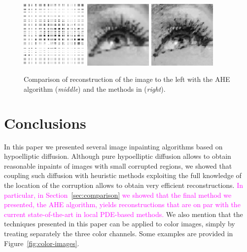 \documentclass[proc]{edpsmath}
\begin{document}
{\begin{figure}
  \includegraphics[height = 3.3cm]{imgs/eye-corr-white}\qquad
  \includegraphics[height = 3.3cm]{imgs/eye-ahe}\qquad
  \includegraphics[height = 3.3cm]{imgs/masnou}
  \caption{Comparison of reconstruction of the image to the left with the AHE algorithm (\emph{middle}) and the methods in \cite{cao} (\emph{right}).}
  \label{fig:masnou}
\end{figure}
}

\section{Conclusions}

In this paper we presented several image inpainting algorithms based on hypoelliptic diffusion. Although pure hypoelliptic diffusion allows to obtain reasonable inpaints of images with small corrupted regions, we showed that coupling such diffusion with heuristic methods exploiting the full knowledge of the location of the corruption allows to obtain very efficient reconstructions. 
\textcolor{magenta}{In particular, in Section~\ref{sec:comparison} we showed that the final method we presented, the AHE algorithm, yields reconstructions that are on par with the current state-of-the-art in local PDE-based methods.}
We also mention that the techniques presented in this paper can be applied to color images, simply by treating separately the three color channels. Some examples are provided in Figure~\ref{fig:color-images}.
\end{document}
